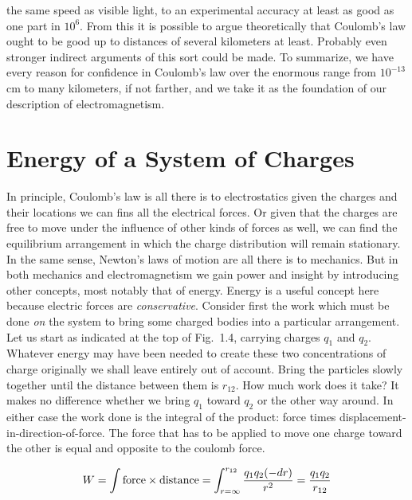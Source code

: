 the same speed as visible light, to an experimental accuracy at least
as good as one part in $10^{6}$. From this it is possible to argue
theoretically that Coulomb's law ought to be good up to distances of
several kilometers at least. Probably even stronger indirect
arguments of this sort could be made.      To summarize, we have
every reason for confidence in Coulomb's law over the enormous range
from $10^{-13}$ cm to many kilometers, if not farther, and we take it
as the foundation of our description of electromagnetism.

\section{Energy of a System of Charges}

In principle, Coulomb's law is all there is to electrostatics given
the charges and their locations we can fins all the electrical
forces. Or given that the charges are free to move under the
influence of other kinds of forces as well, we can find the
equilibrium arrangement in which the charge distribution will remain
stationary. In the same sense, Newton's laws of motion are all there
is to mechanics. But in both mechanics and electromagnetism we gain
power and insight by introducing other concepts, most notably that of
energy. Energy is a useful concept here because electric forces are
\emph{conservative}. Consider first the work which must be done
\emph{on} the system to bring some charged bodies into a particular
arrangement. Let us start as indicated at the top of Fig.~1.4,
carrying charges $q_1$ and $q_2$. Whatever energy may have been
needed to create these two concentrations of charge originally we
shall leave entirely out of account. Bring the particles slowly
together until the distance between them is $r_{12}$. How much work
does it take? It makes no difference whether we bring $q_1$ toward
$q_2$ or the other way around. In either case the work done is the
integral of the product: force times
displacement-in-direction-of-force. The force that has to be applied
to move one charge toward the other is equal and opposite to the
coulomb force.

\begin{equation}
  W = \int \text{force}\times\text{distance} 
    = \int_{r=\infty}^{r_{12}} \frac{q_1q_2(-d r)}{r^2} = \frac{q_1q_2}{r_{12}}
\end{equation}

